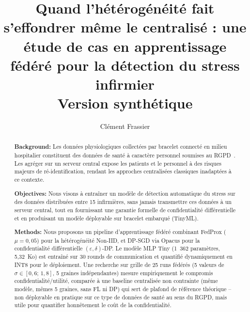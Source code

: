 \documentclass{acmart}
\begin{document}
\title[Hétérogénéité extrême en FL : le centralisé s'effondre aussi]{Quand l'hétérogénéité fait s'effondrer même le centralisé : une étude de cas en apprentissage fédéré pour la détection du stress infirmier \\ \large Version synthétique}

\author{Clément Frassier}

\begin{abstract}
{\bf Background:}
Les données physiologiques collectées par bracelet connecté en milieu hospitalier
constituent des données de santé à caractère personnel soumises au
RGPD~\cite{gdpr2016}. Les agréger sur un serveur central expose les patients et le
personnel à des risques majeurs de ré-identification, rendant les approches
centralisées classiques inadaptées à ce contexte.

{\bf Objectives:}
Nous visons à entraîner un modèle de détection automatique du stress sur des données
distribuées entre 15 infirmières, sans jamais transmettre ces données à un serveur
central, tout en fournissant une garantie formelle de confidentialité différentielle
et en produisant un modèle déployable sur bracelet embarqué (TinyML).

{\bf Methods:}
Nous proposons un pipeline d'apprentissage fédéré combinant FedProx ($\mu = 0{,}05$)
pour la hétérogénéité Non-IID, et DP-SGD via Opacus pour la confidentialité
différentielle $(\varepsilon, \delta)$-DP. Le modèle MLP Tiny (1~362 paramètres,
5,32~Ko) est entraîné sur 30 rounds de communication et quantifié dynamiquement en
INT8 pour le déploiement. Une recherche sur grille de 25 runs fédérés
(5 valeurs de $\sigma \in [0{,}6;\, 1{,}8]$, 5 graines indépendantes) mesure
empiriquement le compromis confidentialité/utilité, comparée à une baseline
centralisée non contrainte (même modèle, mêmes 5 graines, sans FL ni DP) qui sert de
plafond de référence théorique -- non déployable en pratique sur ce type de données
de santé au sens du RGPD, mais utile pour quantifier honnêtement le coût de la
confidentialité.


\end{abstract}
\end{document}
